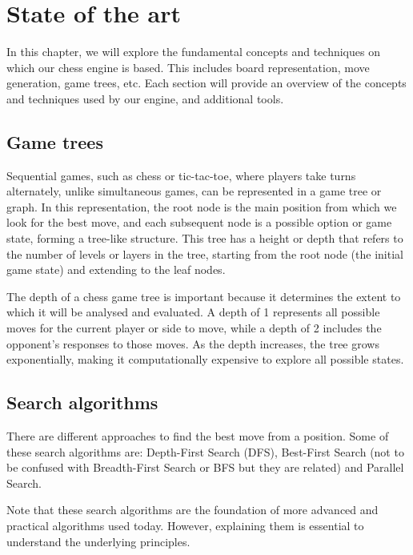 \chapter{State of the art}
\label{cap:estadoDeLaCuestion}

In this chapter, we will explore the fundamental concepts and techniques on which our chess engine is based. This includes board representation, move generation, game trees, etc. Each section will provide an overview of the concepts and techniques used by our engine, and additional tools.

\section{Game trees}

Sequential games, such as chess or tic-tac-toe, where players take turns alternately, unlike simultaneous games, can be represented in a game tree or graph. In this representation, the root node is the main position from which we look for the best move, and each subsequent node is a possible option or game state, forming a tree-like structure. This tree has a height or depth that refers to the number of levels or layers in the tree, starting from the root node (the initial game state) and extending to the leaf nodes.

\vspace{1em}

\noindent The depth of a chess game tree is important because it determines the extent to which it will be analysed and evaluated. A depth of 1 represents all possible moves for the current player or side to move, while a depth of 2 includes the opponent's responses to those moves. As the depth increases, the tree grows exponentially, making it computationally expensive to explore all possible states.

\section{Search algorithms}

There are different approaches to find the best move from a position. Some of these search algorithms are: Depth-First Search (DFS), Best-First Search (not to be confused with Breadth-First Search or BFS but they are related) and Parallel Search.

\vspace{1em}

\noindent Note that these search algorithms are the foundation of more advanced and practical algorithms used today. However, explaining them is essential to understand the underlying principles.

